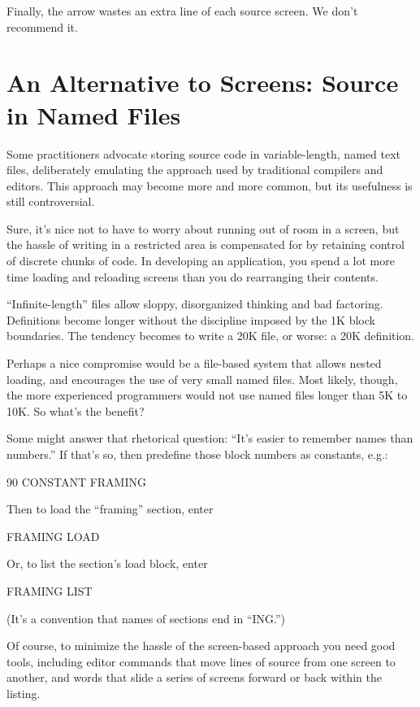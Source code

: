 Finally, the arrow wastes an extra line of each source screen.  We
don't recommend it.
\section{An Alternative to Screens: Source in Named Files}

Some \Forth{} practitioners advocate storing source code in variable-length,
named text files, deliberately emulating the approach used by
traditional compilers and editors.  This approach may become more and
more common, but its usefulness is still controversial.

Sure, it's nice not to have to worry about running out of room in a
screen, but the hassle of writing in a restricted area is compensated for by
retaining control of discrete chunks of code.  In developing an application,
you spend a lot more time loading and reloading screens than you do rearranging
their contents.

``Infinite-length'' files allow sloppy, disorganized thinking and bad
factoring.  Definitions become longer without the discipline imposed by
the 1K block boundaries.  The tendency becomes to write a 20K file, or
worse: a 20K definition.

Perhaps a nice compromise would be a file-based system that allows
nested loading, and encourages the use of very small named files.  Most
likely, though, the more experienced \Forth{} programmers would not
use named files longer than 5K to 10K.  So what's the benefit?

Some might answer that rhetorical question: ``It's easier to remember
names than numbers.'' If that's so, then predefine those block
numbers as constants, e.g.:
\begin{Code}
90 CONSTANT FRAMING
\end{Code}
Then to load the ``framing'' section, enter
\begin{Code}
FRAMING LOAD
\end{Code}
Or, to list the section's load block, enter
\begin{Code}
FRAMING LIST
\end{Code}
(It's a convention that names of sections end in ``ING.'')

Of course, to minimize the hassle of the screen-based approach you
need good tools, including editor commands that move lines of source
from one screen to another, and words that slide a series of screens forward
or back within the listing.


